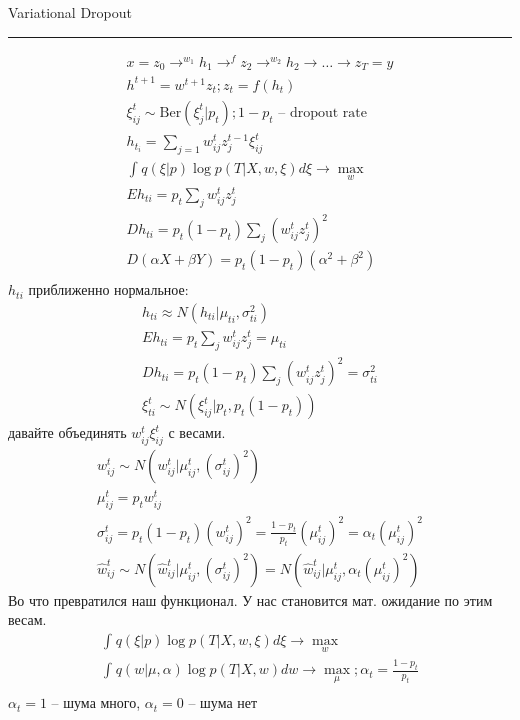 \documentclass{minimal}
\begin{document}
Variational Dropout\\
\hrule
\begin{gather*}
  x=z_0\rightarrow^{w_1}h_1\rightarrow^{f}z_2\rightarrow^{w_2}h_2\rightarrow\dots\rightarrow z_T=y\\
  h^{t+1}= w^{t+1}z_t; z_t=f(h_t)\\
  \xi_{ij}^{t} \sim \mathrm{Ber}(\xi_j^t|p_t); 1-p_t \textrm{ -- dropout rate}\\
  h_{t_i}=\sum_{j=1}^{} {w^t_{ij}z_j^{t-1}\xi^{t}_{ij}}\\
  \int_{}^{} {q(\xi|p)\log p(T|X,w,\xi)d\xi} \rightarrow \max_w\\
  Eh_{ti}=p_t \sum_{j}^{} {w^t_{ij}z^t_{j}}\\
  Dh_{ti}=p_t(1-p_t)\sum_{j}^{} {(w^{t}_{ij}z_j^t)^2}\\
  D(\alpha X+\beta Y)=p_t(1-p_t)(\alpha^2+\beta^2)\\
\end{gather*}
$h_{ti}$ приближенно нормальное:
\begin{gather*}
  h_{ti} \approx N(h_{ti}|\mu_{ti}, \sigma^2_{ti})\\
  Eh_{ti}=p_t \sum_{j}^{} {w^t_{ij}z^t_{j}}=\mu_{ti}\\
  Dh_{ti}=p_t(1-p_t)\sum_{j}^{} {(w^{t}_{ij}z_j^t)^2}=\sigma^2_{ti}\\
  \xi^t_{ti} \sim N(\xi^t_{ij}|p_t, p_t(1-p_t))
\end{gather*}
давайте объединять $w^t_{ij}\xi^t_{ij}$ с весами.
 \begin{gather*}
   w^t_{ij} \sim N(w^t_{ij}|\mu^t_{ij},(\sigma^t_{ij})^2)\\
   \mu^t_{ij} = p_tw^t_{ij}\\
   \sigma^t_{ij} = p_t(1-p_t)(w^t_{ij})^2=\frac{1-p_t}{p_t}(\mu^t_{ij})^2=\alpha_t(\mu^t_{ij})^2\\
   \hat{w}^t_{ij} \sim N\left(\hat{w}^t_{ij}|\mu^t_{ij},(\sigma^t_{ij})^2\right)=N\left(\hat{w}^t_{ij}|\mu^t_{ij}, \alpha_t(\mu^t_{ij})^2\right)
\end{gather*}
Во что превратился наш функционал. У нас становится мат. ожидание по этим весам.
\begin{gather*}
  \int_{}^{} {q(\xi|p)\log p(T|X,w,\xi)d\xi} \rightarrow \max_w\\
  \int_{}^{} {q(w|\mu, \alpha)\log p(T|X,w)dw} \rightarrow \max_\mu; \alpha_t = \frac{1-p_t}{p_t}\\
\end{gather*}
$\alpha_t=1$ -- шума много, $\alpha_t=0$ -- шума нет\\
\end{document}
